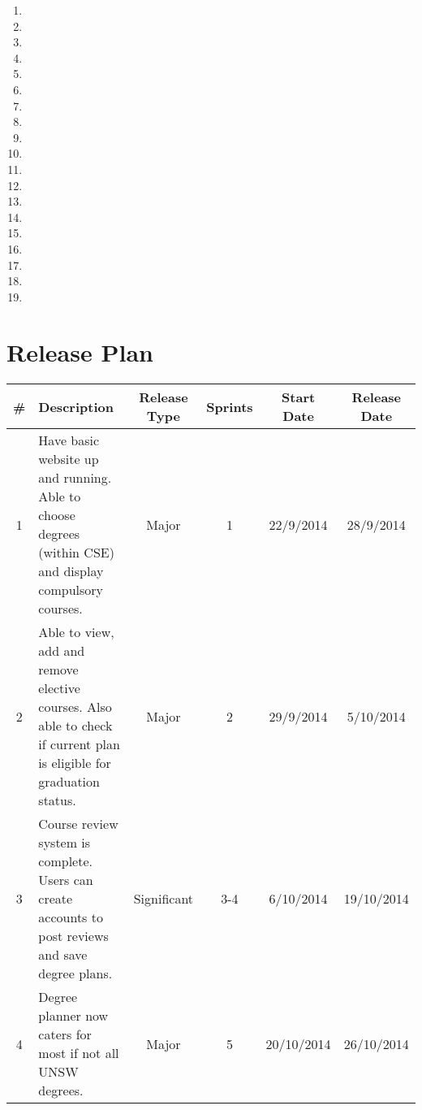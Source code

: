 \documentclass[12pt,titlepage]{article}
\begin{document}
\begin{enumerate}
   \item \storyElevenPointThree{} 
   \item \storyElevenPointFour{}
   \item \storyElevenPointFive{}
   \item \storyFivePointThree{} 
   \item \storyFivePointFive{}
   \item \storyNinePointOne{}
   \item \storyNinePointThree{} 
   \item \storyNinePointFour{}
   \item \storyTenPointOne{}
   \item \storyTwelvePointOne{}
   \item \storyTwelvePointTwo{}
   \item \storyTwelvePointThree{} 
   \item \storyTwelvePointFour{}
   \item \storySixPointOne{}
   \item \storySixPointTwo{}
   \item \storyFivePointSeven{} 
   \item \storyFivePointSix{}
   \item \storyElevenPointSix{}
   \item \storyThirteenPointOne{}
\end{enumerate}

\section{Release Plan}

\begin{table}[H]
\centering
\def\tabularxcolumn#1{m{#1}}
\begin{tabularx}{0.9\paperwidth}{|c|X|c|c|c|c|}
\hline
\textbf{\#} & \textbf{Description} & \textbf{Release Type} & \textbf{Sprints} &
\textbf{Start Date} & \textbf{Release Date} \\
\hline
1 & Have basic website up and running. Able to choose degrees (within CSE) and
    display compulsory courses. & Major & 1 & 22/9/2014 & 28/9/2014 \\
\hline
2 & Able to view, add and remove elective courses. Also able to check if current
    plan is eligible for graduation status. & Major & 2 & 29/9/2014 & 5/10/2014
    \\
\hline
3 & Course review system is complete. Users can create accounts to post reviews
    and save degree plans. & Significant & 3-4 & 6/10/2014 & 19/10/2014 \\
\hline
4 & Degree planner now caters for most if not all UNSW degrees. & Major & 5 &
20/10/2014 & 26/10/2014 \\
\hline
\end{tabularx}
\end{table}
\restoregeometry
\end{document}
